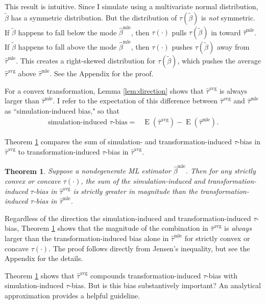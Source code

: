 \documentclass[12pt]{article}
\newtheorem{theorem}{Theorem}
\DeclareMathOperator*{\E}{\text{E}}
\begin{document}
\noindent This result is intuitive. Since I simulate using a multivariate normal distribution, $\tilde{\beta}$ has a symmetric distribution. But the distribution of $\tau(\tilde{\beta})$ is \emph{not} symmetric. If $\tilde{\beta}$ happens to fall below the mode $\hat{\beta}^\text{mle}$, then $\tau(\cdot)$ pulls $\tau(\tilde{\beta})$ in toward $\hat{\tau}^\text{mle}$.
If $\tilde{\beta}$ happens to fall above the mode $\hat{\beta}^\text{mle}$, then $\tau(\cdot)$ pushes $\tau(\tilde{\beta})$ away from $\hat{\tau}^\text{mle}$. This creates a right-skewed distribution for $\tau(\tilde{\beta})$, which pushes the average $\hat{\tau}^\text{avg}$ above $\hat{\tau}^\text{mle}$. See the Appendix for the proof.

For a convex transformation, Lemma \ref{lem:direction} shows that $\hat{\tau}^\text{avg}$ is always larger than $\hat{\tau}^\text{mle}$. I refer to the expectation of this difference between $\hat{\tau}^\text{avg}$ and $\hat{\tau}^\text{mle}$ as ``simulation-induced bias," so that
\begin{align*}
\text{simulation-induced } \tau\text{-bias} =& \E \left(\hat{\tau}^\text{avg} \right) - \E \left(\hat{\tau}^\text{mle} \right).
\end{align*}

Theorem \ref{thm:direction} compares the sum of simulation- and transformation-induced $\tau$-bias in $\hat{\tau}^\text{avg}$ to transformation-induced $\tau$-bias in $\hat{\tau}^\text{avg}$.

\begin{theorem}\label{thm:direction}
Suppose a nondegenerate ML estimator $\hat{\beta}^\text{mle}$.
Then for any strictly convex or concave $\tau(\cdot)$, the sum of the simulation-induced and transformation-induced $\tau$-bias in $\hat{\tau}^{\text{avg}}$ is strictly greater in magnitude than the transformation-induced $\tau$-bias in $\hat{\tau}^{\text{mle}}$.
\end{theorem}

\noindent Regardless of the direction the simulation-induced and transformation-induced $\tau$-bias, Theorem \ref{thm:direction} shows that the magnitude of the combination in $\hat{\tau}^{\text{avg}}$ is \textit{always} larger than the transformation-induced bias alone in  $\hat{\tau}^{\text{mle}}$ for strictly convex or concave $\tau(\cdot)$. The proof follows directly from Jensen's inequality, but see the Appendix for the details.

Theorem \ref{thm:direction} shows that $\hat{\tau}^\text{avg}$ compounds transformation-induced $\tau$-bias with simulation-induced $\tau$-bias. But is this bias substantively important? An analytical approximation provides a helpful guideline.
\end{document}
